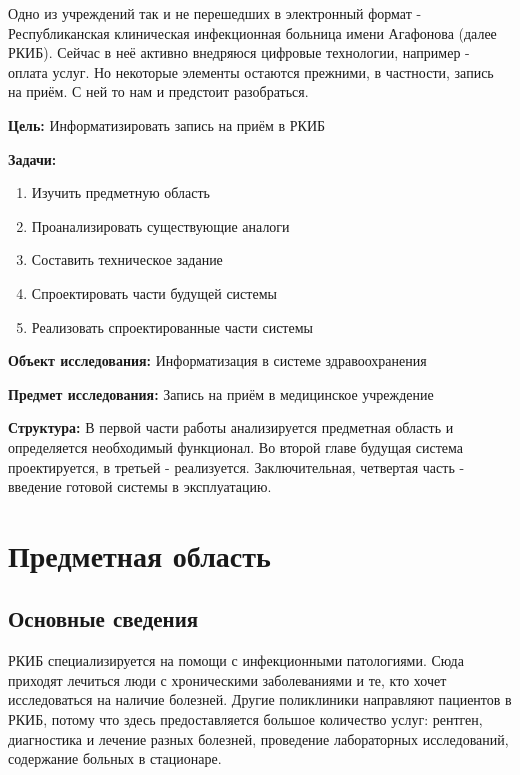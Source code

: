 \documentclass[a4paper,article]{article}
\begin{document}
        Одно из учреждений так и не перешедших в электронный формат - Республиканская клиническая инфекционная больница имени Агафонова (далее РКИБ). Сейчас в неё активно внедряюся цифровые технологии, например - оплата услуг. Но некоторые элементы остаются прежними, в частности, запись на приём. С ней то нам и предстоит разобраться.

        \textbf{Цель:} Информатизировать запись на приём в РКИБ

        \textbf{Задачи:}

        \begin{enumerate}[nolistsep]
            \item Изучить предметную область
            \item Проанализировать существующие аналоги
            \item Составить техническое задание
            \item Спроектировать части будущей системы
            \item Реализовать спроектированные части системы
        \end{enumerate}

        \textbf{Объект исследования:} Информатизация в системе здравоохранения

        \textbf{Предмет исследования:} Запись на приём в медицинское учреждение

        \textbf{Структура:} В первой части работы анализируется предметная область и определяется необходимый функционал. Во второй главе будущая система проектируется, в третьей - реализуется. Заключительная, четвертая часть - введение готовой системы в эксплуатацию.

        \newpage

    \section{Предметная область}

    \subsection{Основные сведения}

        РКИБ специализируется на помощи с инфекционными патологиями. Сюда приходят лечиться люди с хроническими заболеваниями и те, кто хочет исследоваться на наличие болезней. Другие поликлиники направляют пациентов в РКИБ, потому что здесь предоставляется большое количество услуг: рентген, диагностика и лечение разных болезней, проведение лабораторных исследований, содержание больных в стационаре.
\end{document}
